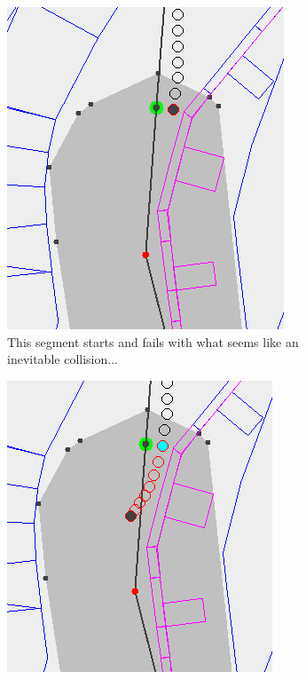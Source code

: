 \begin{figure}[t]
	\centering
	
	\begin{subfigure}[t]{.45\textwidth}
        		\includegraphics[width=\textwidth]{img/leuven-fail-pre}
        		\caption{This segment starts and fails with what seems like an inevitable collision...}
        		\label{fig:leuven-fail-pre}
	\end{subfigure}
	\hfill
	\begin{subfigure}[t]{.45\textwidth}
        		\includegraphics[width=\textwidth]{img/leuven-fail-post}

\end{subfigure}
\end{figure}
